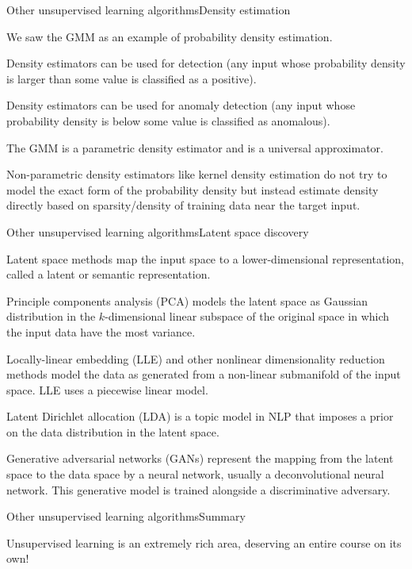 \documentclass{beamer}
\begin{document}
\begin{frame}{Other unsupervised learning algorithms}{Density estimation}

  We saw the GMM as an example of \alert{probability density estimation}.

  \medskip

  Density estimators can be used for \alert{detection} (any input whose
  probability density is larger than some value is classified as a positive).

  \medskip

  Density estimators can be used for \alert{anomaly detection}
  (any input whose probability density is below some value is classified
  as anomalous).

  \medskip

  The GMM is a \alert{parametric density estimator} and is a \alert{universal
  approximator}.

  \medskip

  \alert{Non-parametric density estimators} like kernel density estimation
  do not try to model the exact form of the probability density but instead
  estimate density directly based on sparsity/density of training data
  near the target input.

\end{frame}


\begin{frame}{Other unsupervised learning algorithms}{Latent space discovery}

  \alert{Latent space} methods map 
  the input space to a lower-dimensional representation, called
  a \alert{latent} or \alert{semantic} representation.

  \medskip

  \alert{Principle components analysis}
  (PCA) models the latent space as Gaussian
  distribution in the $k$-dimensional linear subspace of the original space
  in which the input data have the most variance.

  \medskip

  \alert{Locally-linear embedding} (LLE) and other
  nonlinear dimensionality reduction methods
  model the data as generated from a non-linear
  submanifold of the input space. LLE uses a piecewise linear model.

  \medskip

  \alert{Latent Dirichlet allocation} (LDA)
  is a \alert{topic model} in NLP that
  imposes a prior on the data distribution in the latent space.

  \medskip

  \alert{Generative adversarial networks} (GANs) represent the
  mapping from the latent space to the data space by a neural network,
  usually a deconvolutional neural network. This generative model is
  trained alongside a discriminative adversary.

\end{frame}


\begin{frame}{Other unsupervised learning algorithms}{Summary}

  Unsupervised learning is an extremely rich area, deserving an entire
  course on its own!

\end{frame}
\end{document}
